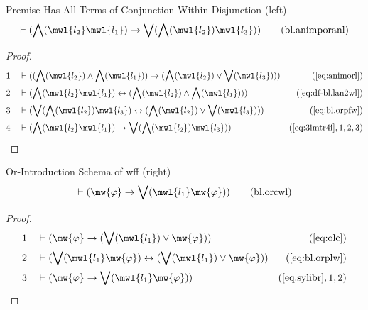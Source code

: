 \begin{lemma} Premise Has All Terms of Conjunction
Within Disjunction (left)
\begin{align}
\vdash ( \bigwedge( \mwl{l_2} \mwl{l_1} ) \rightarrow \bigvee( \bigwedge(
    \mwl{l_2} ) \mwl{l_3} ) )\label{eq:bl.animporanl}\tag{bl.animporanl}
\end{align}
\end{lemma}

\begin{proof}
\begin{align}
  1 &&  & \vdash ( ( \bigwedge( \mwl{l_2} ) \wedge \bigwedge( \mwl{l_1} ) ) \rightarrow ( \bigwedge( \mwl{l_2} ) \vee \bigvee( \mwl{l_3} ) ) )&(\mbox{\ref{eq:animorl}})\notag
  \\ 2 &&  & \vdash ( \bigwedge( \mwl{l_2} \mwl{l_1} ) \leftrightarrow ( \bigwedge( \mwl{l_2} ) \wedge \bigwedge( \mwl{l_1} ) ) )&(\mbox{\ref{eq:df-bl.lan2wl}})\notag
  \\ 3 &&  & \vdash ( \bigvee( \bigwedge( \mwl{l_2} ) \mwl{l_3} ) \leftrightarrow ( \bigwedge( \mwl{l_2} ) \vee \bigvee( \mwl{l_3} ) ) )&(\mbox{\ref{eq:bl.orpfw}})\notag
  \\ 4 &&  & \vdash ( \bigwedge( \mwl{l_2} \mwl{l_1} ) \rightarrow \bigvee( \bigwedge( \mwl{l_2} ) \mwl{l_3} ) )&(\mbox{\ref{eq:3imtr4i}},1,2,3)\notag
\end{align}
\end{proof}

\begin{lemma} Or-Introduction Schema of wff (right)
\begin{align}
\vdash ( \mw{\varphi} \rightarrow \bigvee( \mwl{l_1} \mw{\varphi} )
    )\label{eq:bl.orcwl}\tag{bl.orcwl}
\end{align}
\end{lemma}

\begin{proof}
\begin{align}
  1 &&  & \vdash ( \mw{\varphi} \rightarrow ( \bigvee( \mwl{l_1} ) \vee \mw{\varphi} ) )&(\mbox{\ref{eq:olc}})\notag
  \\ 2 &&  & \vdash ( \bigvee( \mwl{l_1} \mw{\varphi} ) \leftrightarrow ( \bigvee( \mwl{l_1} ) \vee \mw{\varphi} ) )&(\mbox{\ref{eq:bl.orplw}})\notag
  \\ 3 &&  & \vdash ( \mw{\varphi} \rightarrow \bigvee( \mwl{l_1} \mw{\varphi} ) )&(\mbox{\ref{eq:sylibr}},1,2)\notag
\end{align}
\end{proof}

